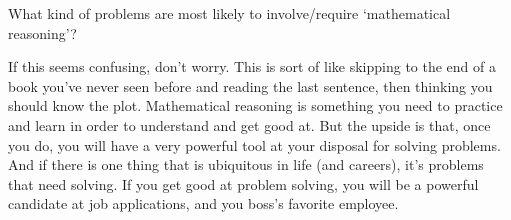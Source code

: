 \documentclass{ximera}
\begin{document}
\begin{exploration}
        What kind of problems are most likely to involve/require `mathematical reasoning'?
        \begin{multipleChoice}
        \end{multipleChoice}
    \end{exploration}

If this seems confusing, don't worry. This is sort of like skipping to the end of a book you've never seen before and reading the last sentence, then thinking you should know the plot. Mathematical reasoning is something you need to practice and learn in order to understand and get good at. But the upside is that, once you do, you will have a very powerful tool at your disposal for solving problems. And if there is one thing that is ubiquitous in life (and careers), it's problems that need solving. If you get good at problem solving, you will be a powerful candidate at job applications, and you boss's favorite employee.
\end{document}
